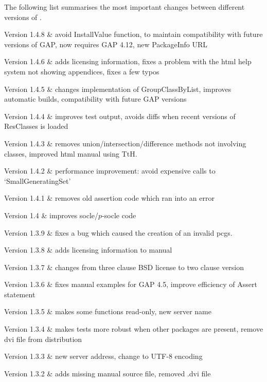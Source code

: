 
The following list summarises the most important changes between different versions of \CRISP.

\beginitems
Version 1.4.8 &
	avoid InstallValue function, to maintain compatibility with future versions of GAP, now requires GAP 4.12, new PackageInfo URL

Version 1.4.6 &
	adds licensing information, fixes a problem with the html help system not showing appendices, fixes a few typos
	
Version 1.4.5 &
	changes implementation of GroupClassByList, improves automatic builds, compatibility with future GAP versions
	
Version  1.4.4 &
	improves test output, avoids diffs when recent versions of ResClasses is loaded

Version 1.4.3 &
	removes union/intersection/difference methods not involving classes, improved html manual using TtH.

Version 1.4.2 & 
	performance improvement: avoid expensive calls to `SmallGeneratingSet'
	
Version 1.4.1 &
	removes old assertion code which ran into an error
	
Version 1.4 &
	improves socle/$p$-socle code
	
Version 1.3.9 &
	fixes a bug which caused the creation of an invalid pcgs.
	
Version 1.3.8 &
	adds licensing information to manual
	
Version 1.3.7 &
	changes from three clause BSD license to two clause version
	
Version 1.3.6 & 
	fixes manual examples for GAP 4.5, improve efficiency of Assert statement
	
Version 1.3.5 &
	makes some functions read-only, new server name
	
Version 1.3.4 & 
	makes tests more robust when other packages are present, remove dvi file from distribution
	
Version 1.3.3 &	
	new server address, change to UTF-8 encoding
	
Version 1.3.2 &
	adds missing manual source file, removed .dvi file
	
